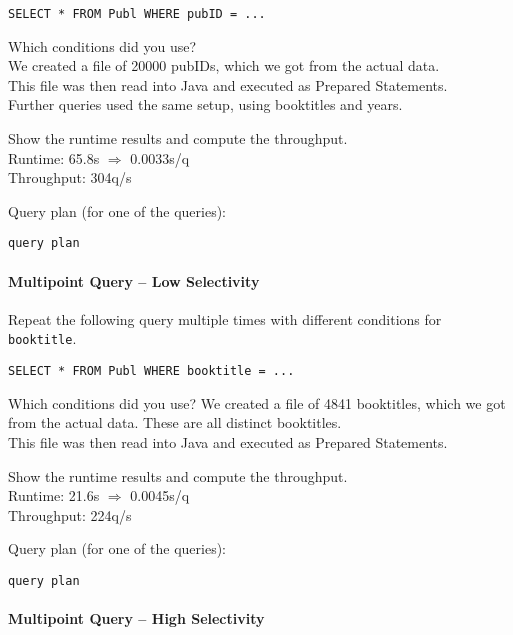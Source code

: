 \documentclass[11pt]{scrartcl}
\begin{document}
{\small
\begin{verbatim}
SELECT * FROM Publ WHERE pubID = ...
\end{verbatim}
}

\noindent
Which conditions did you use?\\
We created a file of 20000 pubIDs, which we got from the actual data.\\
This file was then read into Java and executed as Prepared Statements.\\
Further queries used the same setup, using booktitles and years.

\smallskip\noindent
Show the runtime results and compute the throughput.\\
Runtime: 65.8s $\Rightarrow$ 0.0033s/q\\
Throughput: 304q/s

\smallskip\noindent
Query plan (for one of the queries):
{\small
\begin{verbatim}
query plan
\end{verbatim}
}


\paragraph{Multipoint Query -- Low Selectivity}

Repeat the following query multiple times with different conditions for {\tt booktitle}.

{\small
\begin{verbatim}
SELECT * FROM Publ WHERE booktitle = ...
\end{verbatim}
}

\noindent
Which conditions did you use?
We created a file of 4841 booktitles, which we got from the actual data. These are all distinct booktitles.\\
This file was then read into Java and executed as Prepared Statements.

\smallskip\noindent
Show the runtime results and compute the throughput.\\
Runtime: 21.6s $\Rightarrow$ 0.0045s/q\\
Throughput: 224q/s

\smallskip\noindent
Query plan (for one of the queries):
{\small
\begin{verbatim}
query plan
\end{verbatim}
}


\paragraph{Multipoint Query -- High Selectivity}
\end{document}

